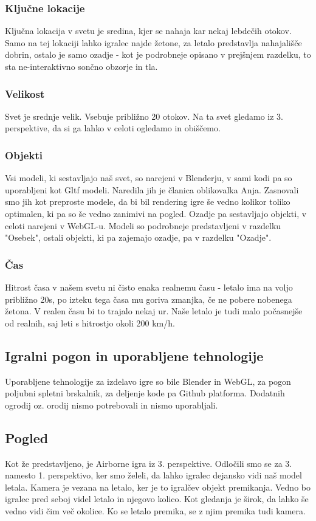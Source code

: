 \documentclass[a4paper]{article}
\begin{document}
\subsubsection{Ključne lokacije}%
Ključna lokacija v svetu je sredina, kjer se nahaja kar nekaj lebdečih otokov. Samo na tej lokaciji lahko igralec najde žetone, za letalo predstavlja nahajališče dobrin, ostalo je samo ozadje - kot je podrobneje opisano v prejšnjem razdelku, to sta ne-interaktivno sončno obzorje in tla.

\subsubsection{Velikost}%
Svet je srednje velik. Vsebuje približno 20 otokov. Na ta svet gledamo iz 3. perspektive, da si ga lahko v celoti ogledamo in obiščemo. 

\subsubsection{Objekti}%
Vsi modeli, ki sestavljajo naš svet, so narejeni v Blenderju, v sami kodi pa so uporabljeni kot Gltf modeli. Naredila jih je članica oblikovalka Anja. Zasnovali smo jih kot preproste modele, da bi bil rendering igre še vedno kolikor toliko optimalen, ki pa so še vedno zanimivi na pogled. Ozadje pa sestavljajo objekti, v celoti narejeni v WebGL-u. Modeli so podrobneje predstavljeni v razdelku "Osebek", ostali objekti, ki pa zajemajo ozadje, pa v razdelku "Ozadje". 

\subsubsection{Čas}%
Hitrost časa v našem svetu ni čisto enaka realnemu času - letalo ima na voljo približno 20s, po izteku tega časa mu goriva zmanjka, če ne pobere nobenega žetona. V realen času bi to trajalo nekaj ur. Naše letalo je tudi malo počasnejše od realnih, saj leti s hitrostjo okoli 200 km/h.

\subsection{Igralni pogon in uporabljene tehnologije}%
Uporabljene tehnologije za izdelavo igre so bile Blender in WebGL, za pogon poljubni spletni brskalnik, za deljenje kode pa Github platforma. Dodatnih ogrodij oz. orodij nismo potrebovali in nismo uporabljali.

\subsection{Pogled}%
Kot že predstavljeno, je Airborne igra iz 3. perspektive. Odločili smo se za 3. namesto 1. perspektivo, ker smo želeli, da lahko igralec dejansko vidi naš model letala. Kamera je vezana na letalo, ker je to igralčev objekt premikanja. Vedno bo igralec pred seboj videl letalo in njegovo kolico. Kot gledanja je širok, da lahko še vedno vidi čim več okolice. Ko se letalo premika, se z njim premika tudi kamera.
\end{document}

